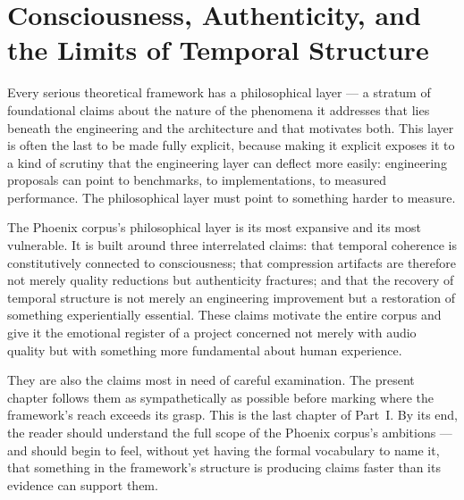 
\chapter{Consciousness, Authenticity, and the Limits of Temporal Structure}
\label{ch:consciousness}


\noindent
Every serious theoretical framework has a philosophical layer ---
a stratum of foundational claims about the nature of the
phenomena it addresses that lies beneath the engineering and
the architecture and that motivates both. This layer is often
the last to be made fully explicit, because making it explicit
exposes it to a kind of scrutiny that the engineering layer
can deflect more easily: engineering proposals can point to
benchmarks, to implementations, to measured performance. The
philosophical layer must point to something harder to measure.

The Phoenix corpus's philosophical layer is its most expansive
and its most vulnerable. It is built around three interrelated
claims: that temporal coherence is constitutively connected to
consciousness; that compression artifacts are therefore not
merely quality reductions but authenticity fractures; and that
the recovery of temporal structure is not merely an engineering
improvement but a restoration of something experientially
essential. These claims motivate the entire corpus and give
it the emotional register of a project concerned not merely
with audio quality but with something more fundamental about
human experience.

They are also the claims most in need of careful examination.
The present chapter follows them as sympathetically as possible
before marking where the framework's reach exceeds its grasp.
This is the last chapter of Part~I. By its end, the reader
should understand the full scope of the Phoenix corpus's
ambitions --- and should begin to feel, without yet having
the formal vocabulary to name it, that something in the
framework's structure is producing claims faster than its
evidence can support them.

